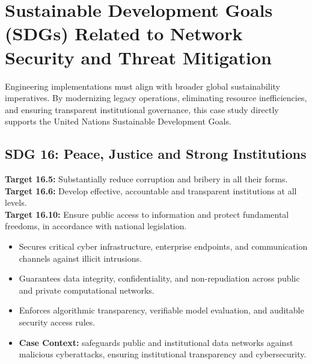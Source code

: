 \section{Sustainable Development Goals (SDGs) Related to Network Security and Threat Mitigation}
Engineering implementations must align with broader global sustainability imperatives. By modernizing legacy operations, eliminating resource inefficiencies, and ensuring transparent institutional governance, this case study directly supports the United Nations Sustainable Development Goals.

\subsection{SDG 16: Peace, Justice and Strong Institutions}
\noindent\textbf{Target 16.5:} Substantially reduce corruption and bribery in all their forms. \\
\noindent\textbf{Target 16.6:} Develop effective, accountable and transparent institutions at all levels. \\
\noindent\textbf{Target 16.10:} Ensure public access to information and protect fundamental freedoms, in accordance with national legislation.
\begin{itemize}
  \item Secures critical cyber infrastructure, enterprise endpoints, and communication channels against illicit intrusions.
  \item Guarantees data integrity, confidentiality, and non-repudiation across public and private computational networks.
  \item Enforces algorithmic transparency, verifiable model evaluation, and auditable security access rules.
  \item \textbf{Case Context:} safeguards public and institutional data networks against malicious cyberattacks, ensuring institutional transparency and cybersecurity.
\end{itemize}
